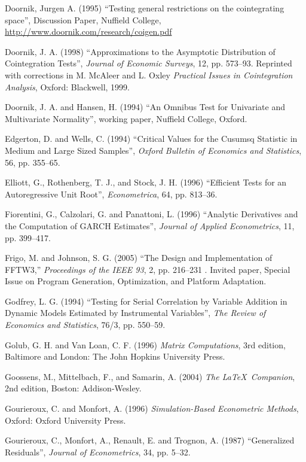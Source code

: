 \begin{thebibliography}
  Doornik, Jurgen A. (1995) ``Testing general restrictions on the
  cointegrating space'', Discussion Paper, Nuffield College,
  \url{http://www.doornik.com/research/coigen.pdf}

  Doornik, J. A. (1998) ``Approximations to the Asymptotic
  Distribution of Cointegration Tests'', \emph{Journal of Economic
    Surveys}, 12, pp. 573--93.  Reprinted with corrections in M.
  McAleer and L. Oxley \emph{Practical Issues in Cointegration
    Analysis}, Oxford: Blackwell, 1999.

  Doornik, J. A. and Hansen, H. (1994) ``An Omnibus Test for
  Univariate and Multivariate Normality'', working paper, Nuffield
  College, Oxford.

  Edgerton, D. and Wells, C. (1994) ``Critical Values for the Cusumsq
  Statistic in Medium and Large Sized Samples'', \emph{Oxford Bulletin
    of Economics and Statistics}, 56, pp. 355--65.

  Elliott, G., Rothenberg, T. J., and Stock, J. H. (1996) ``Efficient
  Tests for an Autoregressive Unit Root'', \emph{Econometrica}, 64,
  pp. 813--36.

  Fiorentini, G., Calzolari, G. and Panattoni, L. (1996) ``Analytic
  Derivatives and the Computation of GARCH Estimates'', \emph{Journal
    of Applied Econometrics}, 11, pp. 399--417.

  Frigo, M. and Johnson, S. G. (2005) ``The Design and Implementation of
  FFTW3,'' \emph{Proceedings of the IEEE 93}, 2, pp. 216--231 . Invited
  paper, Special Issue on Program Generation, Optimization, and Platform
  Adaptation.
  
  Godfrey, L. G. (1994) ``Testing for Serial Correlation by Variable
  Addition in Dynamic Models Estimated by Instrumental Variables'', 
  \emph{The Review of Economics and Statistics}, 76/3, pp. 550--59.

  Golub, G. H. and Van Loan, C. F. (1996) \emph{Matrix Computations},
  3rd edition, Baltimore and London: The John Hopkins University
  Press.

  Goossens, M., Mittelbach, F., and Samarin, A. (2004) \emph{The
    \LaTeX\ Companion}, 2nd edition, Boston: Addison-Wesley.

  Gourieroux, C. and Monfort, A. (1996) \emph{Simulation-Based
    Econometric Methods}, Oxford: Oxford University Press.

  Gourieroux, C., Monfort, A., Renault, E. and Trognon, A. (1987)
  ``Generalized Residuals'', \emph{Journal of Econometrics}, 34,
  pp. 5--32.  


\end{thebibliography}
